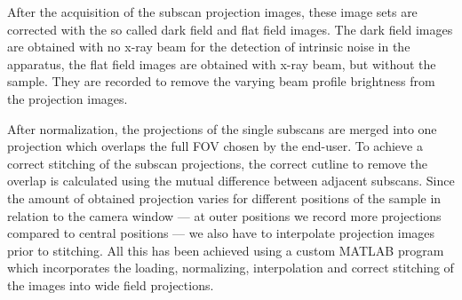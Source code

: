 After the acquisition of the subscan projection images, these image sets are corrected with the so called dark field and flat field images. The dark field images are obtained with no x-ray beam for the detection of intrinsic noise in the apparatus, the flat field images are obtained with x-ray beam, but without the sample. They are recorded to remove the varying beam profile brightness from the projection images.

After normalization, the projections of the single subscans are merged into one projection which overlaps the full FOV chosen by the end-user. To achieve a correct stitching of the subscan projections, the correct cutline to remove the overlap is calculated using the mutual difference between adjacent subscans. Since the amount of obtained projection varies for different positions of the sample in relation to the camera window --- at outer positions we record more projections compared to central positions --- we also have to interpolate projection images prior to stitching. All this has been achieved using a custom MATLAB\textsuperscript{\textregistered} program which incorporates the loading, normalizing, interpolation and correct stitching of the images into wide field projections.

